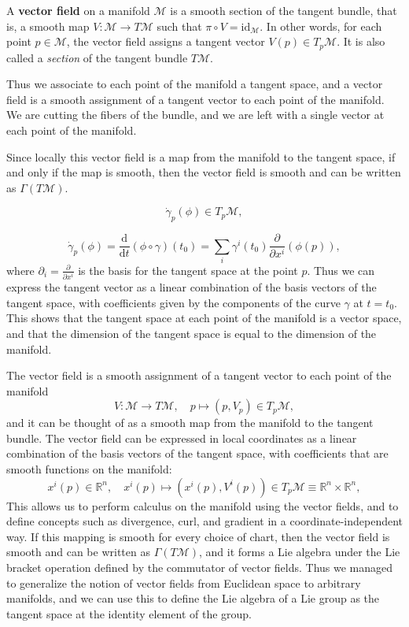 \begin{definition}
    A \textbf{vector field} on a manifold \(\mathcal{M}\) is a smooth section of the tangent bundle, that is, a smooth map \(V : \mathcal{M} \to T\mathcal{M}\) such that \(\pi \circ V = \mathrm{id}_{\mathcal{M}}\). In other words, for each point \(p \in \mathcal{M}\), the vector field assigns a tangent vector \(V(p) \in T_p \mathcal{M}\). It is also called a \textit{section} of the tangent bundle \(T\mathcal{M}\).
\end{definition}

Thus we associate to each point of the manifold a tangent space, and a vector field is a smooth assignment of a tangent vector to each point of the manifold. We are cutting the fibers of the bundle, and we are left with a single vector at each point of the manifold.

Since locally this vector field is a map from the manifold to the tangent space, if and only if the map is smooth, then the vector field is smooth and can be written as \(\Gamma(T\mathcal{M})\).





\[
    \dot{\gamma}_p(\phi) \in T_p \mathcal{M},
\]

\[
    \dot{\gamma}_p(\phi) = \frac{\mathrm{d}}{\mathrm{d} t} (\phi \circ \gamma) (t_0) = \sum_{i} \gamma^i(t_0) \frac{\partial}{\partial x^i} (\phi(p)),
\]
where \(\partial_i = \frac{\partial}{\partial x^i}\) is the basis for the tangent space at the point \(p\). Thus we can express the tangent vector as a linear combination of the basis vectors of the tangent space, with coefficients given by the components of the curve \(\gamma\) at \(t=t_0\). This shows that the tangent space at each point of the manifold is a vector space, and that the dimension of the tangent space is equal to the dimension of the manifold.

The vector field is a smooth assignment of a tangent vector to each point of the manifold
\[
    V : \mathcal{M} \to T\mathcal{M}, \quad p \mapsto (p, V_p) \in T_p \mathcal{M},
\]
and it can be thought of as a smooth map from the manifold to the tangent bundle. The vector field can be expressed in local coordinates as a linear combination of the basis vectors of the tangent space, with coefficients that are smooth functions on the manifold:
\[
    x^i (p) \in \mathbb{R}^n, \quad x^i (p) \mapsto (x^i (p), V^i(p)) \in T_p \mathcal{M} \equiv \mathbb{R}^n \times \mathbb{R}^n,
\]
This allows us to perform calculus on the manifold using the vector fields, and to define concepts such as divergence, curl, and gradient in a coordinate-independent way. If this mapping is smooth for every choice of chart, then the vector field is smooth and can be written as \(\Gamma(T\mathcal{M})\), and it forms a Lie algebra under the Lie bracket operation defined by the commutator of vector fields. Thus we managed to generalize the notion of vector fields from Euclidean space to arbitrary manifolds, and we can use this to define the Lie algebra of a Lie group as the tangent space at the identity element of the group.


